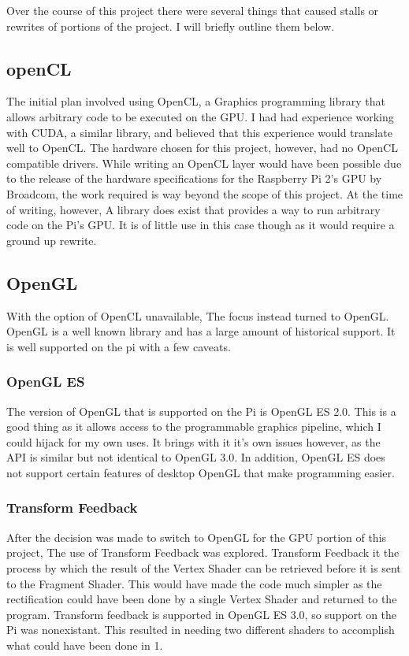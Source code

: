 Over the course of this project there were several things that caused stalls or rewrites of portions of the project.  I will briefly outline them below.

\subsection{openCL}
The initial plan involved using OpenCL, a Graphics programming library that allows arbitrary code to be executed on the GPU.  I had had experience working with CUDA, a similar library, and believed that this experience would translate well to OpenCL.  The hardware chosen for this project, however, had no OpenCL compatible drivers.  While writing an OpenCL layer would have been possible due to the release of the hardware specifications for the Raspberry Pi 2's GPU by Broadcom, the work required is way beyond the scope of this project.  At the time of writing, however, A library does exist that provides a way to run arbitrary code on the Pi's GPU.  It is of little use in this case though as it would require a ground up rewrite.

\subsection{OpenGL}
With the option of OpenCL unavailable, The focus instead turned to OpenGL.  OpenGL is a well known library and has a large amount of historical support.  It is well supported on the pi with a few caveats.
\subsubsection{OpenGL ES}
The version of OpenGL that is supported on the Pi is OpenGL ES 2.0.  This is a good thing as it allows access to the programmable graphics pipeline, which I could hijack for my own uses.  It brings with it it's own issues however, as the API is similar but not identical to OpenGL 3.0.  In addition, OpenGL ES does not support certain features of desktop OpenGL that make programming easier.
\subsubsection{Transform Feedback}
After the decision was made to switch to OpenGL for the GPU portion of this project, The use of Transform Feedback was explored.  Transform Feedback it the process by which the result of the Vertex Shader can be retrieved before it is sent to the Fragment Shader.  This would have made the code much simpler as the rectification could have been done by a single Vertex Shader and returned to the program.  Transform feedback is supported in OpenGL ES 3.0, so support on the Pi was nonexistant.  This resulted in needing two different shaders to accomplish what could have been done in 1.

